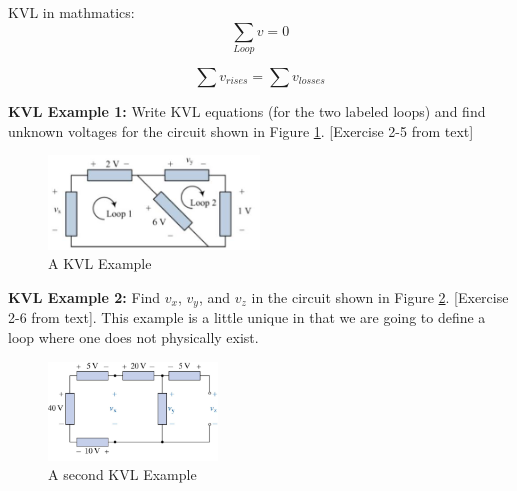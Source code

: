 \documentclass{handout}
\begin{document}
KVL in mathmatics:
\begin{equation}
\sum_{Loop} v = 0 
\end{equation}

\begin{equation}
\sum v_{rises} = \sum v_{losses}
\end{equation}

\textbf{KVL Example 1:} Write KVL equations (for the two labeled loops) and find unknown voltages for the circuit shown in Figure \ref{fig: KVL_Example_1}.  [Exercise 2-5 from text]

\begin{figure}[h b t]
\centering
\includegraphics[width=0.5\textwidth]{KVL_Example_1.jpg}
\caption{A KVL Example}
\label{fig: KVL_Example_1}
\end{figure}


\newpage
\pagebreak
\clearpage

\textbf{KVL Example 2:} Find $v_x$, $v_y$, and $v_z$ in the circuit shown in Figure \ref{fig: KVL_Example_2}. [Exercise 2-6 from text]. This example is a little unique in that we are going to define a loop where one does not physically exist. 

\begin{figure}[h b t]
\centering
\includegraphics[width=0.4\textwidth]{KVL_Example_2_unlabeled_loops.jpg}
\caption{A second KVL Example}
\label{fig: KVL_Example_2}
\end{figure}
\end{document}
